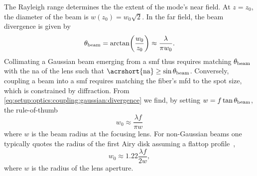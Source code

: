 The Rayleigh range determines the the extent of the mode's near field.
At $z=z_0$, the diameter of the beam is $w(z_0) = w_0\sqrt{2}$.
In the far field, the beam divergence is given by
\begin{equation}\label{eq:setup:optics:coupling:gaussian:divergence}
    \theta_{\mathrm{beam}} = \arctan(\frac{w_0}{z_0}) \approx \frac{\lambda}{\pi w_0}.
\end{equation}
Collimating a Gaussian beam emerging from a \gls{smf} thus requires matching $\theta_{\mathrm{beam}}$ with the \gls{na} of the lens such that $\mr{\acrshort{na}}\geq\sin\theta_{\mr{beam}}$.
Conversely, coupling a beam into a \gls{smf} requires matching the fiber's \gls{mfd} to the spot size, which is constrained by diffraction.
From \cref{eq:setup:optics:coupling:gaussian:divergence} we find, by setting $w = f\tan\theta_{\mathrm{beam}}$, the rule-of-thumb
\begin{equation}\label{eq:setup:optics:coupling:gaussian:diffraction_limit}
    w_0 \approx \frac{\lambda f}{\pi w}
\end{equation}
where $w$ is the beam radius at the focusing lens.
For non-Gaussian beams one typically quotes the radius of the first Airy disk assuming a flattop profile~\cite{Hecht2017},
\begin{equation}\label{eq:setup:optics:coupling:flattop:diffraction_limit}
    w_0 \approx 1.22\frac{\lambda f}{2 w},
\end{equation}
where $w$ is the radius of the lens aperture.

